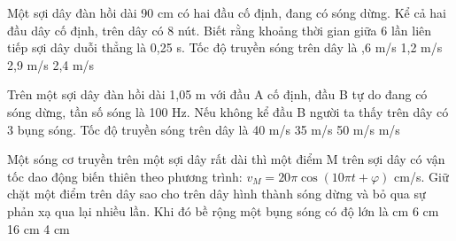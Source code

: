 \begin{vidu}%
 Một sợi dây đàn hồi dài 90 cm có hai đầu cố định, đang có sóng dừng. Kể cả hai đầu dây cố định, trên dây có 8 nút. Biết rằng khoảng thời gian giữa 6 lần liên tiếp sợi dây duỗi thẳng là 0,25 s. Tốc độ truyền sóng trên dây là
\choice
{,6 m/s}
{1,2 m/s}
{2,9 m/s}
{2,4 m/s}
\end{vidu} %
\begin{vidu}%
Trên một sợi dây đàn hồi dài 1,05 m với đầu A cố định, đầu B tự do đang có sóng dừng, tần số sóng là 100 Hz. Nếu không kể đầu B người ta thấy trên dây có 3 bụng sóng. Tốc độ truyền sóng trên dây là
\choice
{40 m/s}
{35 m/s}
{50 m/s}
{ m/s}
\end{vidu} %
\begin{vidu}%
Một sóng cơ truyền trên một sợi dây rất dài thì một điểm M trên sợi dây có vận tốc dao động biến thiên theo phương trình:  $v_M=20\pi \cos(10\pi t + \varphi )$ cm/s. Giữ chặt một điểm trên dây sao cho trên dây hình thành sóng dừng và bỏ qua sự phản xạ qua lại nhiều lần. Khi đó bề rộng một bụng sóng có độ lớn là
\choice
{ cm}
{6 cm}
{16 cm}
{4 cm}
\end{vidu} %
